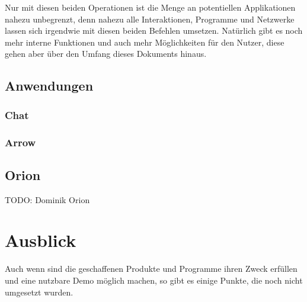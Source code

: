 \documentclass[a4paper,11pt,titlepage,twoside]{memoir}
\begin{document}
\noindent Nur mit diesen beiden Operationen ist die Menge an
potentiellen Applikationen nahezu unbegrenzt, denn nahezu alle
Interaktionen, Programme und Netzwerke lassen sich irgendwie mit
diesen beiden Befehlen umsetzen. Natürlich gibt es noch mehr interne
Funktionen und auch mehr Möglichkeiten für den Nutzer, diese gehen
aber über den Umfang dieses Dokuments hinaus.
\section{Anwendungen}
\label{sec:org4075980}
\subsection{Chat}
\label{sec:org276e70a}
\subsection{Arrow}
\label{sec:org3af36aa}
\section{Orion}
\label{sec:org79d6365}
TODO: Dominik Orion
\chapter{Ausblick}
\label{sec:org057ef0c}
Auch wenn sind die geschaffenen Produkte und Programme ihren Zweck
erfüllen und eine nutzbare Demo möglich machen, so gibt es einige
Punkte, die noch nicht umgesetzt wurden.
\end{document}
